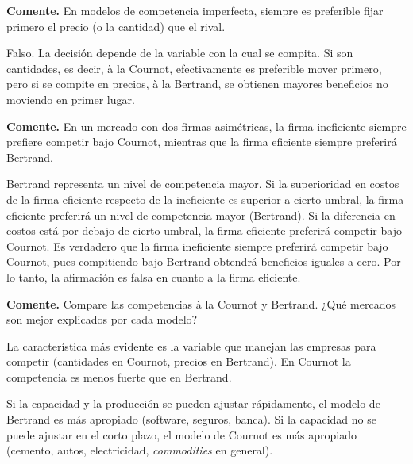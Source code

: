 \question \textbf{Comente.} En modelos de competencia imperfecta, siempre es preferible fijar primero el precio (o la cantidad) que el rival.
\begin{solution}
Falso. La decisión depende de la variable con la cual se compita. Si son cantidades, es decir, à la Cournot, efectivamente es preferible mover primero, pero si se compite en precios, à la Bertrand, se obtienen mayores beneficios no moviendo en primer lugar.

\end{solution}

\question \textbf{Comente.} En un mercado con dos firmas asimétricas, la firma ineficiente siempre prefiere competir bajo Cournot, mientras que la firma eficiente siempre preferirá Bertrand.
\begin{solution}
Bertrand representa un nivel de competencia mayor. Si la superioridad en costos de la firma eficiente respecto de la ineficiente es superior a cierto umbral, la firma eficiente preferirá un nivel de competencia mayor (Bertrand). Si la diferencia en costos está por debajo de cierto umbral, la firma eficiente preferirá competir bajo Cournot. Es verdadero que la firma ineficiente siempre preferirá competir bajo Cournot, pues compitiendo bajo Bertrand obtendrá beneficios iguales a cero. Por lo tanto, la afirmación es falsa en cuanto a la firma eficiente.

\end{solution}

\question \textbf{Comente.} Compare las competencias à la Cournot y Bertrand. ¿Qué mercados son mejor explicados por cada modelo?
\begin{solution}
La característica más evidente es la variable que manejan las empresas para competir (cantidades en Cournot, precios en Bertrand). En Cournot la competencia es menos fuerte que en Bertrand.

Si la capacidad y la producción se pueden ajustar rápidamente, el modelo de Bertrand es más apropiado (software, seguros, banca). Si la capacidad no se puede ajustar en el corto plazo, el modelo de Cournot es más apropiado (cemento, autos, electricidad, \emph{commodities} en general).

\end{solution}
